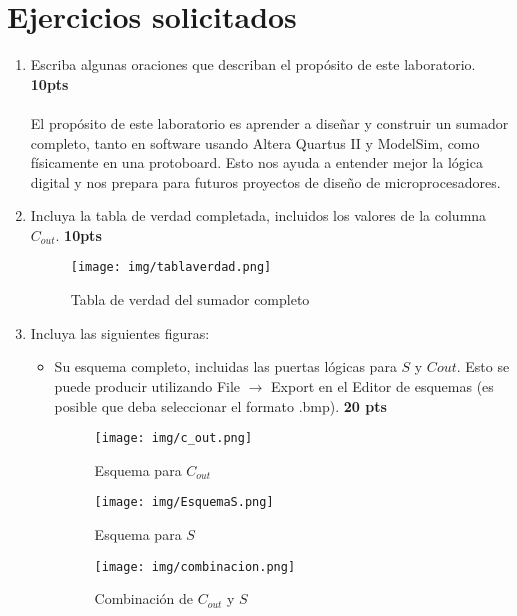 \documentclass{templateNote}
\begin{document}

\portada
\margenes

\section*{Ejercicios solicitados}

    
\begin{enumerate}
    \item Escriba algunas oraciones que describan el propósito de este laboratorio. \textbf{10pts}
    \\\\ El propósito de este laboratorio es aprender a diseñar y construir un sumador completo, tanto en software usando Altera Quartus II y ModelSim, 
    como físicamente en una protoboard. Esto nos ayuda a entender mejor la lógica digital y nos prepara para futuros proyectos de diseño de microprocesadores.
    \item Incluya la tabla de verdad completada, incluidos los valores de la columna $C_{out}$. \textbf{10pts}
    \begin{figure}[H]
        \centering
        \texttt{[image: img/tablaverdad.png]}
        \caption{Tabla de verdad del sumador completo}
    \end{figure}
    \item Incluya las siguientes figuras:
    \begin{itemize}
        \item Su esquema completo, incluidas las puertas lógicas para $S$ y $C{out}$. Esto se puede producir utilizando File $\rightarrow$ Export en el Editor de esquemas (es posible que deba seleccionar el formato .bmp). \textbf{20 pts}
        \begin{figure}[H]
            \centering
            \texttt{[image: img/c\_out.png]}
            \caption{Esquema para $C_{out}$}
            \centering
            \texttt{[image: img/EsquemaS.png]}
            \caption{Esquema para $S$}
            \centering
            \texttt{[image: img/combinacion.png]}
            \caption{Combinación de $C_{out}$ y $S$}
        \end{figure}

\end{itemize}
\end{enumerate}
\end{document}
